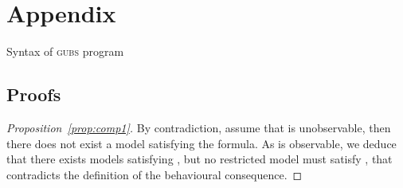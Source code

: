 \documentclass{eptcs}
\newcounter{ti}
\begin{document}
\vfill 
\section*{Appendix}
\begin{table}[ht]

\label{tab:syntax}
\caption{Syntax of \textsc{gubs} program}
\end{table}
\subsection*{Proofs}
\begin{proof}[Proposition~\ref{prop:comp1}]
By contradiction, assume that  is unobservable, then there does not exist a model satisfying the formula. As  is observable, we deduce that there exists models satisfying , but no restricted model must satisfy , that contradicts the definition of the behavioural consequence.
\end{proof}
\end{document}
